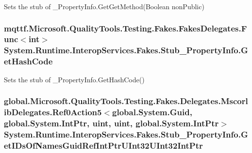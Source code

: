 Sets the stub of \-\_\-\-Property\-Info.\-Get\-Get\-Method(\-Boolean non\-Public)

\hypertarget{class_system_1_1_runtime_1_1_interop_services_1_1_fakes_1_1_stub___property_info_a22bfc5890bc77f82cffc526e4bfe1b03}{
\subsubsection[{Get\-Hash\-Code}]{\setlength{\rightskip}{0pt plus 5cm}mqttf.\-Microsoft.\-Quality\-Tools.\-Testing.\-Fakes.\-Fakes\-Delegates.\-Func$<$int$>$ System.\-Runtime.\-Interop\-Services.\-Fakes.\-Stub\-\_\-\-Property\-Info.\-Get\-Hash\-Code}}\label{class_system_1_1_runtime_1_1_interop_services_1_1_fakes_1_1_stub___property_info_a22bfc5890bc77f82cffc526e4bfe1b03}


Sets the stub of \-\_\-\-Property\-Info.\-Get\-Hash\-Code()

\hypertarget{class_system_1_1_runtime_1_1_interop_services_1_1_fakes_1_1_stub___property_info_a9e1af011735221518d67355a7ff9f43b}{
\subsubsection[{Get\-I\-Ds\-Of\-Names\-Guid\-Ref\-Int\-Ptr\-U\-Int32\-U\-Int32\-Int\-Ptr}]{\setlength{\rightskip}{0pt plus 5cm}global.\-Microsoft.\-Quality\-Tools.\-Testing.\-Fakes.\-Delegates.\-Mscorlib\-Delegates.\-Ref0\-Action5$<$global.\-System.\-Guid, global.\-System.\-Int\-Ptr, uint, uint, global.\-System.\-Int\-Ptr$>$ System.\-Runtime.\-Interop\-Services.\-Fakes.\-Stub\-\_\-\-Property\-Info.\-Get\-I\-Ds\-Of\-Names\-Guid\-Ref\-Int\-Ptr\-U\-Int32\-U\-Int32\-Int\-Ptr}}\label{class_system_1_1_runtime_1_1_interop_services_1_1_fakes_1_1_stub___property_info_a9e1af011735221518d67355a7ff9f43b}



